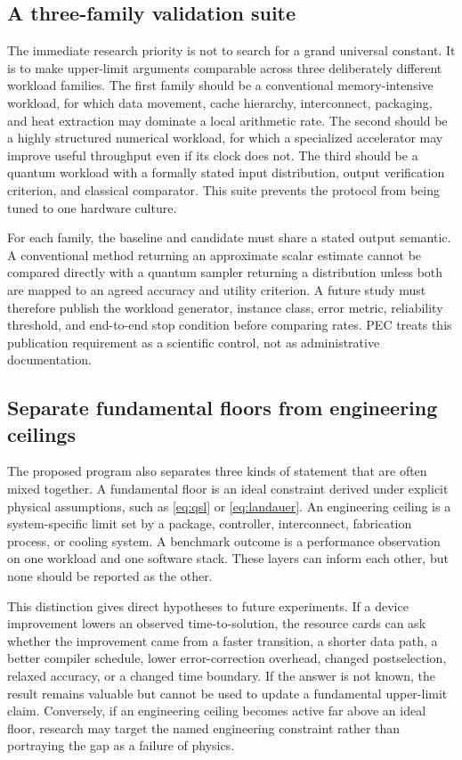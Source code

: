 \documentclass[conference]{IEEEtran}
\begin{document}
\subsection{A three-family validation suite}

The immediate research priority is not to search for a grand universal
constant. It is to make upper-limit arguments comparable across three
deliberately different workload families. The first family should be a
conventional memory-intensive workload, for which data movement, cache
hierarchy, interconnect, packaging, and heat extraction may dominate a local
arithmetic rate. The second should be a highly structured numerical workload,
for which a specialized accelerator may improve useful throughput even if its
clock does not. The third should be a quantum workload with a formally stated
input distribution, output verification criterion, and classical comparator.
This suite prevents the protocol from being tuned to one hardware culture.

For each family, the baseline and candidate must share a stated output
semantic. A conventional method returning an approximate scalar estimate
cannot be compared directly with a quantum sampler returning a distribution
unless both are mapped to an agreed accuracy and utility criterion. A future
study must therefore publish the workload generator, instance class, error
metric, reliability threshold, and end-to-end stop condition before comparing
rates. PEC treats this publication requirement as a scientific control, not
as administrative documentation.

\subsection{Separate fundamental floors from engineering ceilings}

The proposed program also separates three kinds of statement that are often
mixed together. A fundamental floor is an ideal constraint derived under
explicit physical assumptions, such as \eqref{eq:qsl} or
\eqref{eq:landauer}. An engineering ceiling is a system-specific limit set by
a package, controller, interconnect, fabrication process, or cooling system.
A benchmark outcome is a performance observation on one workload and one
software stack. These layers can inform each other, but none should be
reported as the other.

This distinction gives direct hypotheses to future experiments. If a device
improvement lowers an observed time-to-solution, the resource cards can ask
whether the improvement came from a faster transition, a shorter data path, a
better compiler schedule, lower error-correction overhead, changed
postselection, relaxed accuracy, or a changed time boundary. If the answer is
not known, the result remains valuable but cannot be used to update a
fundamental upper-limit claim. Conversely, if an engineering ceiling becomes
active far above an ideal floor, research may target the named engineering
constraint rather than portraying the gap as a failure of physics.
\end{document}
